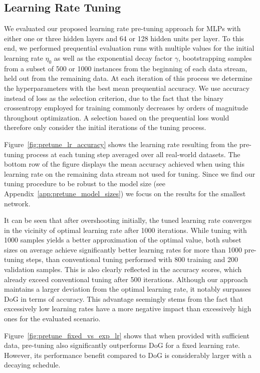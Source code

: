 \documentclass[letterpaper]{article} %
\begin{document}
\subsection{Learning Rate Tuning}

We evaluated our proposed learning rate pre-tuning approach for MLPs with either one or three hidden layers and 64 or 128 hidden units per layer.
To this end, we performed prequential evaluation runs with multiple values for the initial learning rate $\eta_0$ as well as the exponential decay factor $\gamma$, bootstrapping samples from a subset of 500 or 1000 instances from the beginning of each data stream, held out from the remaining data.
At each iteration of this process we determine the hyperparameters with the best mean prequential accuracy.
We use accuracy instead of loss as the selection criterion, due to the fact that the binary crossentropy employed for training commonly decreases by orders of magnitude throughout optimization.
A selection based on the prequential loss would therefore only consider the initial iterations of the tuning process.

Figure~\ref{fig:pretune_lr_accuracy} shows the learning rate resulting from the pre-tuning process at each tuning step averaged over all real-world datasets.
The bottom row of the figure displays the mean accuracy achieved when using this learning rate on the remaining data stream not used for tuning.
Since we find our tuning procedure to be robust to the model size (see Appendix~\ref{app:pretune_model_sizes}) we focus on the results for the smallest network.

It can be seen that after overshooting initially, the tuned learning rate converges in the vicinity of optimal learning rate after 1000 iterations.
While tuning with 1000 samples yields a better approximation of the optimal value, both subset sizes on average achieve significantly better learning rates for more than 1000 pre-tuning steps, than conventional tuning performed with 800 training and 200 validation samples.
This is also clearly reflected in the accuracy scores, which already exceed conventional tuning after 500 iterations.
Although our approach maintains a larger deviation from the optimal learning rate, it notably surpasses DoG in terms of accuracy.
This advantage seemingly stems from the fact that excessively low learning rates have a more negative impact than excessively high ones for the evaluated scenario.

Figure~\ref{fig:pretune_fixed_vs_exp_lr} shows that when provided with sufficient data, pre-tuning also significantly outperforms DoG for a fixed learning rate.
However, its performance benefit compared to DoG is considerably larger with a decaying schedule.
\end{document}
